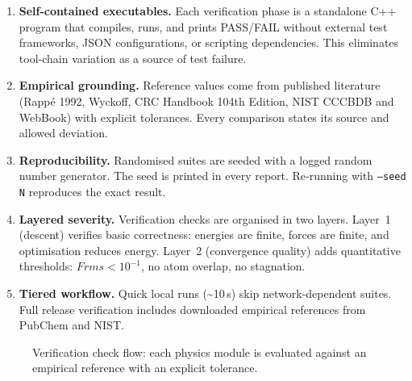 \documentclass[11pt,twoside]{article}
\def\Frms{Frms}%
\newcommand{\Frms}{F_{\mathrm{rms}}}
\begin{document}
\begin{enumerate}
  \item \textbf{Self-contained executables.} Each verification phase is a standalone C++ program that compiles, runs, and prints PASS/FAIL without external test frameworks, JSON configurations, or scripting dependencies. This eliminates tool-chain variation as a source of test failure.

  \item \textbf{Empirical grounding.} Reference values come from published literature (Rapp\'{e} 1992, Wyckoff, CRC Handbook 104th Edition, NIST CCCBDB and WebBook) with explicit tolerances. Every comparison states its source and allowed deviation.

  \item \textbf{Reproducibility.} Randomised suites are seeded with a logged random number generator. The seed is printed in every report. Re-running with \texttt{--seed N} reproduces the exact result.

  \item \textbf{Layered severity.} Verification checks are organised in two layers. Layer~1 (descent) verifies basic correctness: energies are finite, forces are finite, and optimisation reduces energy. Layer~2 (convergence quality) adds quantitative thresholds: $\Frms < 10^{-1}$, no atom overlap, no stagnation.

  \item \textbf{Tiered workflow.} Quick local runs (\textasciitilde10\,s) skip network-dependent suites. Full release verification includes downloaded empirical references from PubChem and NIST.
\end{enumerate}

\begin{figure}[H]
\centering
{}
\caption{Verification check flow: each physics module is evaluated against an empirical reference with an explicit tolerance.}
\label{fig:verification-flow}
\end{figure}
\end{document}
